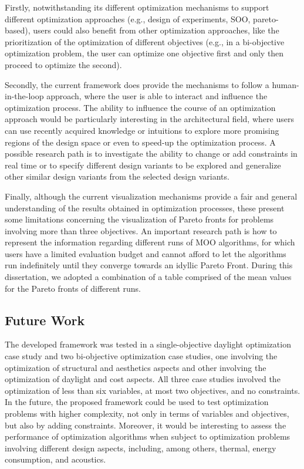 Firstly, notwithstanding its different optimization mechanisms to support different optimization approaches (e.g., design of experiments, \ac{SOO}, pareto-based), users could also benefit from other optimization approaches, like the prioritization of the optimization of different objectives (e.g., in a bi-objective optimization problem, the user can optimize one objective first and only then proceed to optimize the second). 

Secondly, the current framework does provide the mechanisms to follow a human-in-the-loop approach, where the user is able to interact and influence the optimization process. The ability to influence the course of an optimization approach would be particularly interesting in the architectural field, where users can use recently acquired knowledge or intuitions to explore more promising regions of the design space or even to speed-up the optimization process. A possible research path is to investigate the ability to change or add constraints in real time or to specify different design variants to be explored and generalize other similar design variants from the selected design variants.

Finally, although the current visualization mechanisms provide a fair and general understanding of the results obtained in optimization processes, these present some limitations concerning the visualization of Pareto fronts for problems involving more than three objectives. An important research path is how to represent the information regarding different runs of \ac{MOO} algorithms, for which users have a limited evaluation budget and cannot afford to let the algorithms run indefinitely until they converge towards an idyllic Pareto Front. During this dissertation, we adopted a combination of a table comprised of the mean values for the Pareto fronts of different runs.  


\subsection{Future Work}
The developed framework was tested in a single-objective daylight optimization case study and two bi-objective optimization case studies, one involving the optimization of structural and aesthetics aspects and other involving the optimization of daylight and cost aspects. All three case studies involved the optimization of less than six variables, at most two objectives, and no constraints. In the future, the proposed framework could be used to test optimization problems with higher complexity, not only in terms of variables and objectives, but also by adding constraints. Moreover, it would be interesting to assess the performance of optimization algorithms when subject to optimization problems involving different design aspects, including, among others, thermal, energy consumption, and acoustics. 
 
